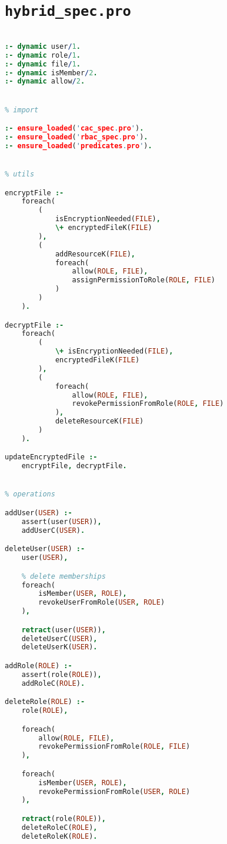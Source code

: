 \section{\texttt{hybrid_spec.pro}}
\label{app:prologcode.hybrid}

\setcode
\begin{lstlisting}[language=Prolog]
% dynamic predicates

:- dynamic user/1.
:- dynamic role/1.
:- dynamic file/1.
:- dynamic isMember/2.
:- dynamic allow/2.


% import

:- ensure_loaded('cac_spec.pro').
:- ensure_loaded('rbac_spec.pro').
:- ensure_loaded('predicates.pro').


% utils

encryptFile :-
    foreach(
        (
            isEncryptionNeeded(FILE),
            \+ encryptedFileK(FILE)
        ),
        (
            addResourceK(FILE),
            foreach(
                allow(ROLE, FILE),
                assignPermissionToRole(ROLE, FILE)
            )
        )
    ).

decryptFile :-
    foreach(
        (
            \+ isEncryptionNeeded(FILE),
            encryptedFileK(FILE)
        ),
        (
            foreach(
                allow(ROLE, FILE),
                revokePermissionFromRole(ROLE, FILE)
            ),
            deleteResourceK(FILE)
        )
    ).

updateEncryptedFile :-
    encryptFile, decryptFile. 


% operations

addUser(USER) :-
    assert(user(USER)),
    addUserC(USER).

deleteUser(USER) :-
    user(USER),

    % delete memberships
    foreach(
        isMember(USER, ROLE),
        revokeUserFromRole(USER, ROLE)
    ),

    retract(user(USER)),
    deleteUserC(USER),
    deleteUserK(USER).

addRole(ROLE) :-
    assert(role(ROLE)),
    addRoleC(ROLE).

deleteRole(ROLE) :-
    role(ROLE),

    foreach(
        allow(ROLE, FILE),
        revokePermissionFromRole(ROLE, FILE)
    ),

    foreach(
        isMember(USER, ROLE),
        revokePermissionFromRole(USER, ROLE)
    ),

    retract(role(ROLE)),
    deleteRoleC(ROLE),
    deleteRoleK(ROLE).


\end{lstlisting}
